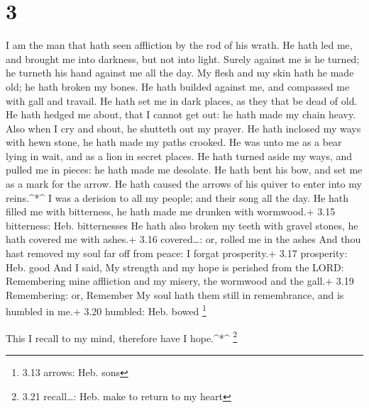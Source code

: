 \hypertarget{section-2}{%
\section{3}\label{section-2}}

 I am the man that hath seen affliction by the rod of his
wrath.  He hath led me, and brought me into darkness, but
not into light.  Surely against me is he turned; he turneth
his hand against me all the day.  My flesh and my skin hath
he made old; he hath broken my bones.  He hath builded
against me, and compassed me with gall and travail.  He hath
set me in dark places, as they that be dead of old.  He hath
hedged me about, that I cannot get out: he hath made my chain heavy.
 Also when I cry and shout, he shutteth out my prayer.
 He hath inclosed my ways with hewn stone, he hath made my
paths crooked.  He was unto me as a bear lying in wait, and
as a lion in secret places.  He hath turned aside my ways,
and pulled me in pieces: he hath made me desolate.  He hath
bent his bow, and set me as a mark for the arrow.  He hath
caused the arrows of his quiver to enter into my reins.\^{}*\^{}
 I was a derision to all my people; and their song all the
day.  He hath filled me with bitterness, he hath made me
drunken with wormwood.+ 3.15 bitterness: Heb. bitternesses 
He hath also broken my teeth with gravel stones, he hath covered me with
ashes.+ 3.16 covered\ldots: or, rolled me in the ashes  And
thou hast removed my soul far off from peace: I forgat prosperity.+ 3.17
prosperity: Heb. good  And I said, My strength and my hope
is perished from the LORD:  Remembering mine affliction and
my misery, the wormwood and the gall.+ 3.19 Remembering: or, Remember
 My soul hath them still in remembrance, and is humbled in
me.+ 3.20 humbled: Heb. bowed \footnote{3.13 arrows: Heb. sons}

 This I recall to my mind, therefore have I hope.\^{}*\^{}
\footnote{3.21 recall\ldots: Heb. make to return to my heart}

